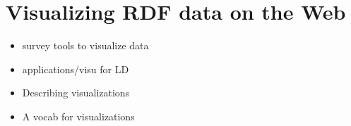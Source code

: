 \chapter{Visualizing RDF data on the Web }
\label{ch:ch3}

\begin{itemize}
\item survey tools to visualize data
\item applications/visu for LD
\item Describing visualizations 
\item A vocab for visualizations
\end{itemize}